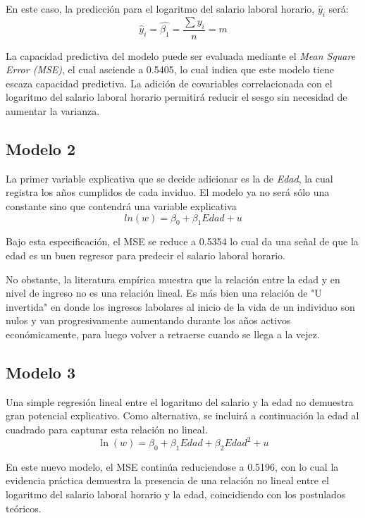 \documentclass[11pt, a4paper]{article}
\begin{document}
En este caso, la predicción para el logaritmo del salario laboral horario, $ \hat{y}_i $ será:
\begin{equation*}
 \hat{y}_i= \hat{\beta_1}= \frac{\sum y_i}{n}=m 
\end{equation*}

 La capacidad predictiva del modelo puede ser evaluada mediante el \textit{Mean Square Error (MSE)}, el cual asciende a 0.5405, lo cual indica que este modelo tiene escaza capacidad predictiva. La adición de covariables correlacionada con el logaritmo del salario laboral horario permitirá reducir el sesgo sin necesidad de aumentar la varianza. 

\subsection{Modelo 2}

La primer variable explicativa que se decide adicionar es la de \textit{Edad}, la cual registra los años cumplidos de cada inviduo. El modelo ya no será sólo una constante sino que contendrá una variable explicativa 
\begin{equation*}
ln(w)=\beta_0 + \beta_1 Edad + u 
\end{equation*}

Bajo esta especificación, el MSE se reduce a 0.5354 lo cual da una señal de que la edad es un buen regresor para predecir el salario laboral horario.

No obstante, la literatura empírica muestra que la relación entre la edad y en nivel de ingreso no es una relación lineal. Es más bien una relación de "U invertida" en donde los ingresos labolares al inicio de la vida de un individuo son nulos y van progresivamente aumentando durante los años activos económicamente, para luego volver a retraerse cuando se llega a la vejez.

\subsection{Modelo 3}

Una simple regresión lineal entre el logaritmo del salario y la edad no demuestra gran potencial explicativo. Como alternativa, se incluirá a continuación la edad al cuadrado para capturar esta relación no lineal.
\begin{equation*}
\ln(w) = \beta_0 +\beta_1 \textit{Edad}  + \beta_2 \textit{Edad} ^2 + u
\end{equation*}

En este nuevo modelo, el MSE continúa reduciendose a 0.5196, con lo cual la evidencia práctica demuestra la presencia de una relación no lineal entre el logaritmo del salario laboral horario y la edad, coincidiendo con los postulados teóricos. 
\end{document}
